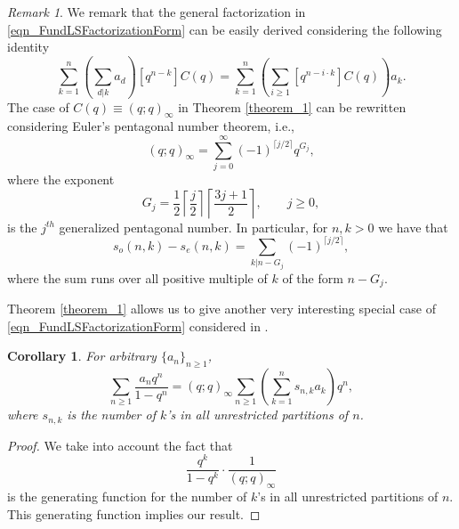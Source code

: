 \documentclass[10pt,reqno]{amsart}
\numberwithin{figure}{section}
\numberwithin{table}{section}
\theoremstyle{plain}
\newtheorem{cor}[theorem]{Corollary}
\numberwithin{theorem}{section}
\theoremstyle{remark}
\newtheorem{remark}[theorem]{Remark}
\begin{document}
\begin{remark} 
We remark that the general factorization in \eqref{eqn_FundLSFactorizationForm} can be easily derived considering the following identity
$$
\sum_{k=1}^n \left( \sum_{d|k} a_d \right) [q^{n-k}] C(q)
=\sum_{k=1}^{n} \left( \sum_{i\geq 1} [q^{n-i\cdot k}] C(q) \right)  a_k.
$$
The case of $C(q)\equiv (q;q)_\infty$ in Theorem \ref{theorem_1} can be rewritten considering Euler's pentagonal number theorem, i.e.,
$$(q;q)_\infty = \sum_{j=0}^{\infty} (-1)^{\lceil j/2 \rceil} q^{G_j},$$
where the exponent
	\begin{equation*}
	G_j = \frac{1}{2} \left\lceil \frac{j}{2} \right\rceil \left\lceil \frac{3j+1}{2} \right\rceil,\qquad j\geq 0,
	\end{equation*}
is the $j^{th}$ generalized pentagonal number. 
In particular, for $n,k>0$ we have that 
\begin{equation*}
s_o(n,k)-s_e(n,k) = \sum_{k | n-G_j} (-1)^{\lceil j/2 \rceil}, 
\end{equation*}
where the sum runs over all positive multiple of $k$ of the form $n-G_j$.
\end{remark}

Theorem \ref{theorem_1}  allows us to give another very interesting special case of 
\eqref{eqn_FundLSFactorizationForm} considered in \cite{MERCA-LSFACTTHM,MERCA-SCHMIDT1}.

\begin{cor}
\label{cor_spcase_of_theorem1_v1} 
	For arbitrary $\{a_n\}_{n \geq 1}$,
	$$\sum_{n \geq 1} \frac{a_n q^n}{1-q^n} = (q;q)_\infty \sum_{n \geq 1} \left( 
	\sum_{k=1}^n s_{n,k} a_k\right) q^n,
	$$
	where $s_{n,k}$ is the number of $k$'s in all unrestricted partitions of $n$.
\end{cor}
\begin{proof}
	We take into account the fact that
	$$\frac{q^k}{1-q^k} \cdot \frac{1}{(q;q)_\infty}$$
	is the generating function for the number of $k$'s in all unrestricted partitions of $n$.
	This generating function implies our result. 
\end{proof}
\end{document}
